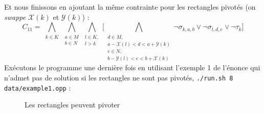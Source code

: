 \documentclass[a4paper]{article}
\begin{document}
Et nous finissons en ajoutant la même contrainte pour les rectangles pivotés (on \textit{swappe} $\mathcal{X}(k)$ et $\mathcal{Y}(k)$) : 
\begin{equation*}
C_{11} = 	\bigwedge\limits_{\substack{k\in K}}
			\bigwedge\limits_{\substack{a \in M \\ b \in N}}
				\bigwedge\limits_{\substack{l\in K,\\ l > k}}
					\bigg[
					\bigwedge\limits_{\substack{d \in M,\\ a-\mathcal{X}(l) < d < a +\mathcal{Y}(k) \\  e \in N, \\b-\mathcal{Y}(l) < e < b +\mathcal{X}(k)}}
						\lnot \sigma_{k,a,b} \lor \lnot \sigma_{l,d,e}	 \lor \lnot \tau_k
					\bigg]
\end{equation*}
Exécutons le programme une dernière fois en utilisant l'exemple 1 de l'énonce qui n'admet pas de solution si les rectangles ne sont pas pivotés, \texttt{./run.sh 8 data/example1.opp} :
\begin{figure}[H]
  \centering
  \caption{Les rectangles peuvent pivoter}
\end{figure}
\end{document}
